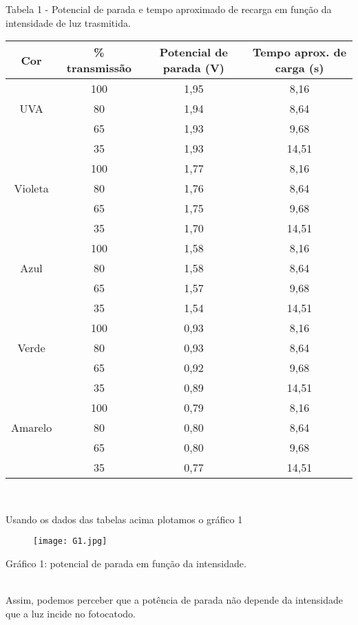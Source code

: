 \documentclass[12pt, a4paper]{article}
\begin{document}
\begin{center}

\quad Tabela 1 - Potencial de parada e tempo aproximado de recarga em função da intensidade de luz trasmitida.\\

    \begin{tabular}{|c|c|c|c|} \hline
        Cor & \% transmissão & Potencial de parada (V) & Tempo aprox. de carga (s) \\ \hline
         & 100 & 1,95 &  8,16 \\  \cline{2-4} 
       UVA & 80 & 1,94 & 8,64 \\ \cline{2-4} 
        & 65 & 1,93 & 9,68 \\ \cline{2-4} 
        & 35 & 1,93 & 14,51 \\ \hline
         & 100 & 1,77 &  8,16 \\  \cline{2-4} 
       Violeta & 80 & 1,76 & 8,64 \\ \cline{2-4} 
        & 65 & 1,75 & 9,68 \\ \cline{2-4} 
        & 35 & 1,70 & 14,51 \\ \hline
        & 100 & 1,58 &  8,16 \\  \cline{2-4} 
       Azul & 80 & 1,58 & 8,64 \\ \cline{2-4} 
        & 65 & 1,57 & 9,68 \\ \cline{2-4} 
        & 35 & 1,54 & 14,51 \\ \hline
         & 100 & 0,93 &  8,16 \\  \cline{2-4} 
       Verde & 80 & 0,93 & 8,64 \\ \cline{2-4} 
        & 65 & 0,92 & 9,68 \\ \cline{2-4} 
        & 35 & 0,89 & 14,51 \\ \hline
         & 100 & 0,79 &  8,16 \\  \cline{2-4} 
       Amarelo & 80 & 0,80 & 8,64 \\ \cline{2-4} 
        & 65 & 0,80 & 9,68 \\ \cline{2-4} 
        & 35 & 0,77 & 14,51 \\ \hline
        \end{tabular}\\

\end{center}
\newpage
\quad Usando os dados das tabelas acima plotamos o gráfico 1

\begin{center}
    \begin{figure}[h]
        \centering
        \texttt{[image: G1.jpg]}
        \label{fig:G1}
    \end{figure}
    Gráfico 1: potencial de parada em função da intensidade.
\end{center}
\\
\quad Assim, podemos perceber que a potência de parada não depende da intensidade que a luz incide no fotocatodo. 
\end{document}
